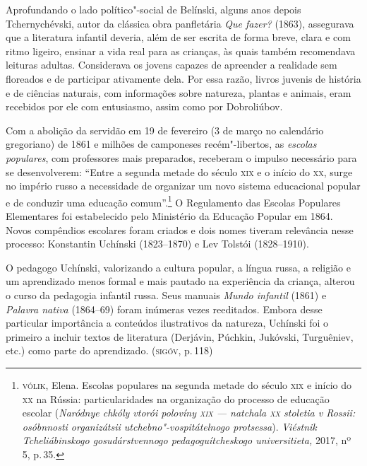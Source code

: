 Aprofundando o lado político"-social de Belínski, alguns anos depois
Tchernychévski, autor da clássica obra panfletária \emph{Que fazer?}
(1863), assegurava que a literatura infantil deveria, além de ser
escrita de forma breve, clara e com ritmo ligeiro, ensinar a vida real
para as crianças, às quais também recomendava leituras adultas.
Considerava os jovens capazes de apreender a realidade sem floreados e
de participar ativamente dela. Por essa razão, livros juvenis de
história e de ciências naturais, com informações sobre natureza, plantas
e animais, eram recebidos por ele com entusiasmo, assim como por
Dobroliúbov.

Com a abolição da servidão em 19 de fevereiro (3 de março no calendário
gregoriano) de 1861 e milhões de camponeses recém"-libertos, as
\emph{escolas} \emph{populares}, com professores mais preparados,
receberam o impulso necessário para se desenvolverem: ``Entre a segunda
metade do século \textsc{xix} e o início do \textsc{xx}, surge no império russo a
necessidade de organizar um novo sistema educacional popular e de
conduzir uma educação comum''.\footnote{\textsc{vólik}, Elena. Escolas populares
  na segunda metade do século \textsc{xix} e início do \textsc{xx} na Rússia:
  particularidades na organização do processo de educação escolar
  (\emph{Naródnye chkóly vtorói polovíny \textsc{xix} --- natchala \textsc{xx} stoletia v
  Rossii: osóbnnosti organizátsii utchebno"-vospitátelnogo protsessa}).
  \emph{Viéstnik Tcheliábinskogo gosudárstvennogo pedagoguítcheskogo
  universitieta,} 2017, nº 5, p.\,35.} O Regulamento das Escolas Populares
Elementares foi estabelecido pelo Ministério da Educação Popular em
1864. Novos compêndios escolares foram criados e dois nomes tiveram
relevância nesse processo: Konstantin Uchínski (1823--1870) e Lev
Tolstói (1828--1910).

O pedagogo Uchínski, valorizando a cultura popular, a língua russa, a
religião e um aprendizado menos formal e mais pautado na experiência da
criança, alterou o curso da pedagogia infantil russa. Seus manuais
\emph{Mundo infantil} (1861) e \emph{Palavra nativa} (1864--69) foram
inúmeras vezes reeditados. Embora desse particular importância a
conteúdos ilustrativos da natureza, Uchínski foi o primeiro a incluir
textos de literatura (Derjávin, Púchkin, Jukóvski, Turguêniev, etc.)
como parte do aprendizado. (\textsc{sigóv}, p.\,118)

